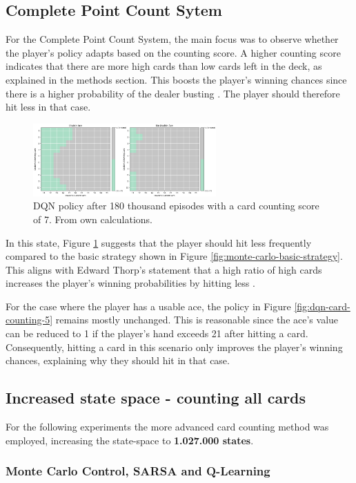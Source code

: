 \documentclass[conference]{IEEEtran}
\begin{document}
\subsection{Complete Point Count Sytem}
For the Complete Point Count System, the main focus was to observe whether the player's policy adapts based on the counting score. A higher counting score indicates that there are more high cards than low cards left in the deck, as explained in the methods section. This boosts the player's winning chances since there is a higher probability of the dealer busting \cite{b1}. The player should therefore hit less in that case.

\begin{figure}
	\centering
	\includegraphics[width=70mm]{figures/DQN/counting-180000/policy-counting-7.png}
	\caption{DQN policy after 180 thousand episodes with a card counting score of 7. From own calculations.}
	\label{fig:dqn-card-counting-7}
\end{figure}

In this state, Figure \ref{fig:dqn-card-counting-7} suggests that the player should hit less frequently compared to the basic strategy shown in Figure \ref{fig:monte-carlo-basic-strategy}. This aligns with Edward Thorp's statement that a high ratio of high cards increases the player's winning probabilities by hitting less \cite{b1}.

For the case where the player has a usable ace, the policy in Figure \ref{fig:dqn-card-counting-5} remains mostly unchanged. This is reasonable since the ace's value can be reduced to 1 if the player's hand exceeds 21 after hitting a card. Consequently, hitting a card in this scenario only improves the player's winning chances, explaining why they should hit in that case.


\subsection{Increased state space - counting all cards}
For the following experiments the more advanced card counting method was employed, increasing the state-space to \textbf{1.027.000 states}. 

\subsubsection{Monte Carlo Control, SARSA and Q-Learning}
\end{document}
